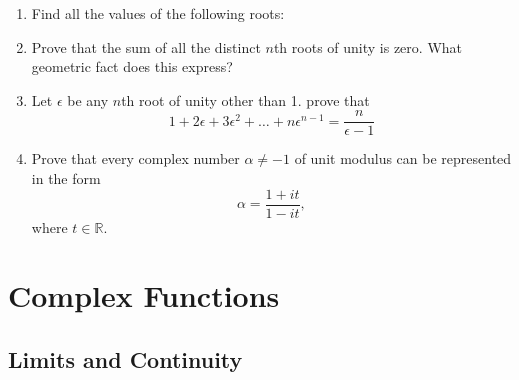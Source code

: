 \documentclass[11pt, oneside]{book}
\begin{document}
\begin{enumerate}
	\item Find all the values of the following roots:


	\item Prove that the sum of all the distinct $n$th roots of unity is zero. What geometric fact does this express?

	\item Let $\epsilon$ be any $n$th root of unity other than 1. prove that
	\begin{equation*}
		1 + 2\epsilon + 3 \epsilon^2 + \hdots + n\epsilon^{n - 1} = \frac{n}{\epsilon - 1} 
	\end{equation*}

	\item Prove that every complex number $\alpha \neq -1$ of unit modulus can be represented in the form
	\begin{equation*}
		\alpha = \frac{1 + it}{1 - it},
	\end{equation*}
	where $t \in \mathbb{R}$.
\end{enumerate}



\chapter{Complex Functions}
	\label{chapter:complex_functions}

\section{Limits and Continuity} %
\label{sec:limits_and_continuity}
\end{document}

